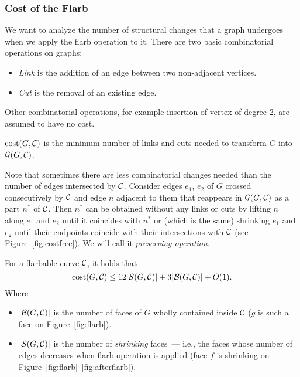 \documentclass[a4paper,11pt]{article}
\begin{document}
\subsubsection{Cost of the Flarb}

We want to analyze the number of structural changes that a graph undergoes when we apply the flarb operation to it. There are two basic combinatorial operations on graphs:

\begin{itemize}
	\item \emph{Link} is the addition of an edge between two non-adjacent vertices.
	\item \emph{Cut} is the removal of an existing edge.
\end{itemize}

Other combinatorial operations, for example insertion of vertex of degree 2, are assumed to have no cost.

\begin{definition}
	$\operatorname{cost} (G, \mathcal C)$ is the minimum number of links and cuts needed to transform $G$ into $\mathcal G (G, \mathcal C)$.
\end{definition}

Note that sometimes there are less combinatorial changes needed than the number of edges intersected by $\mathcal C$. Consider edges $e_1$, $e_2$ of $G$ crossed consecutively by $\mathcal C$ and edge $n$ adjacent to them that reappears in $\mathcal G (G, \mathcal C)$ as a part $n^*$ of $\mathcal C$. Then $n^*$ can be obtained without any links or cuts by lifting $n$ along $e_1$ and $e_2$ until it coincides with $n^*$ or (which is the same) shrinking $e_1$ and $e_2$ until their endpoints coincide with their intersections with $\mathcal C$ (see Figure~\ref{fig:costfree}). We will call it {\itshape preserving operation}.


\begin{theorem}
	For a flarbable curve $\mathcal C$, it holds that \[ \operatorname{cost} (G, \mathcal C) \le 12|\mathcal S (G, \mathcal C)| + 3|\mathcal B (G, \mathcal C)| + O(1). \]
	Where
	\begin{itemize}
		\item $|\mathcal B (G, \mathcal C)|$ is the number of faces of $G$ wholly contained inside $\mathcal C$ ($g$ is such a face on Figure~\ref{fig:flarb}).
		\item $|\mathcal S (G, \mathcal C)|$ is the number of \emph{shrinking} faces~— i.e., the faces whose number of edges decreases when flarb operation is applied (face $f$ is shrinking on Figure~\ref{fig:flarb}–\ref{fig:afterflarb}).
	\end{itemize}
\end{theorem}
\end{document}
